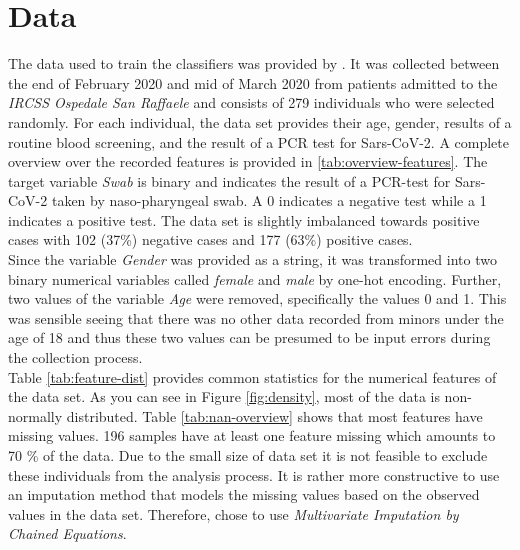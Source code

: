 \section{Data}
The data used to train the classifiers was provided by \citeauthor{RN127} \cite{RN127}. 
It was collected between the end of February 2020 and mid of March 2020 from patients admitted to the \textit{IRCSS Ospedale San Raffaele} and consists of 279 individuals who were selected randomly.
For each individual, the data set provides their age, gender, results of a 
routine blood screening, and the result of a PCR test for Sars-CoV-2.
A complete overview over the recorded features is provided in 
\ref{tab:overview-features}. The target variable \textit{Swab} is binary and 
indicates the result of a PCR-test for Sars-CoV-2 taken by naso-pharyngeal 
swab. A 0 indicates a negative test while a 1 indicates a positive test.
The data set is slightly imbalanced towards positive cases with 102 (37\%) 
negative cases and 177 (63\%) positive cases.
\\
Since the variable \textit{Gender} 
was provided as a string, it was transformed into two binary numerical 
variables called \textit{female} and \textit{male} by one-hot encoding.
Further, two values of the variable \textit{Age} were removed, specifically 
the values 0 and 1. This was sensible seeing that there was no other 
data recorded from minors under the age of 18 and thus these two values can 
be presumed to be input errors during the collection process.
\\
Table \ref{tab:feature-dist} provides common statistics for the numerical 
features of the data set.
As you can see in Figure \ref{fig:density}, most of the data is non-normally 
distributed.
Table \ref{tab:nan-overview} shows that most features have missing values. 196 
samples have at least one feature missing which amounts to 70 \% of the data. 
Due to the small size of data set it is not feasible to exclude these 
individuals from the analysis process. It is rather more constructive to use an 
imputation method that models the missing values based on the observed values in 
the data set. Therefore, \citeauthor{RN127} chose to use \textit{Multivariate 
Imputation by Chained Equations}. 
